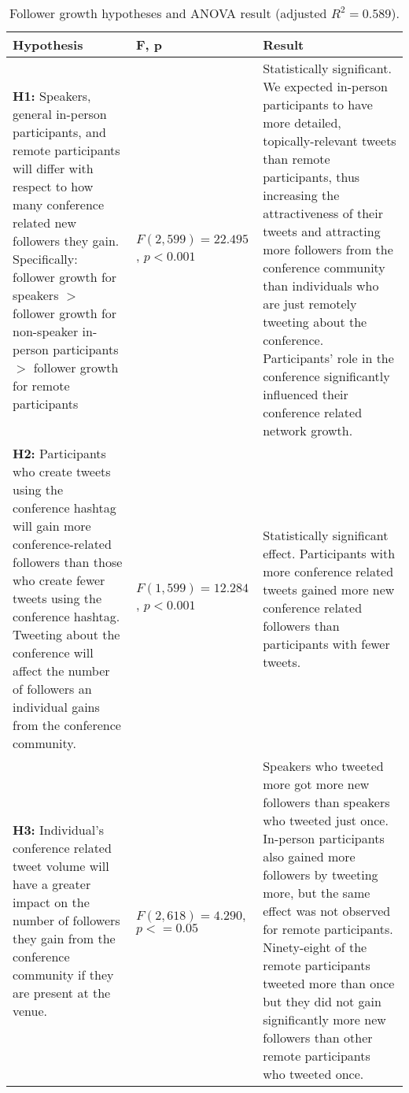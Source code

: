 \documentclass[conference,final]{IEEEtran}
\begin{document}
\begin{table*}[htbp]
	\centering
	  \addtolength{\belowcaptionskip}{-50pt}	
	\setlength\abovecaptionskip{0pt}%
  \setlength\belowcaptionskip{10pt}%
	\caption{Follower growth hypotheses and ANOVA result (adjusted $R^2 = 0.589$).}
	\label{tab:hypothesis}
		\begin{tabular}{|>{\raggedright\arraybackslash}p{}|>{\raggedright\arraybackslash}p{}|>{\raggedright\arraybackslash}p{}|}
			\hline\hline %

Hypothesis  & F, p & Result \\ %
\hline %
\textbf{H1:} Speakers, general in-person participants, and remote participants will differ with respect to how many conference related new followers they gain. Specifically: follower growth for speakers $>$ follower growth for non-speaker in-person participants $>$ follower growth for remote participants & $F(2,599) = 22.495$, $p < 0.001$ & Statistically significant.  We expected in-person participants to have more detailed, topically-relevant tweets than remote participants, thus increasing the attractiveness of their tweets and attracting more followers from the conference community than individuals who are just remotely tweeting about the conference. Participants' role in the conference significantly influenced their conference related network growth.\\ 
\hline
\textbf{H2:} Participants who create tweets using the conference hashtag will gain more conference-related followers than those who create fewer tweets using the conference hashtag. Tweeting about the conference will affect the number of followers an individual gains from the conference community.  & $F(1,599) = 12.284$, $p < 0.001$ & Statistically significant effect. Participants with more conference related tweets gained more new conference related followers than participants with fewer tweets.\\
\hline
\textbf{H3:} Individual's conference related tweet volume will have a greater impact on the number of followers they gain from the conference community if they are present at the venue. &  $F(2,618) = 4.290$, $p <= 0.05$ & Speakers who tweeted more got more new followers than speakers who tweeted just once. In-person participants also gained more followers by tweeting more, but the same effect was not observed for remote participants. Ninety-eight of the remote participants tweeted more than once but they did not gain significantly more new followers than other remote participants who tweeted once.\\
\hline\hline %
		\end{tabular}
	\end{table*}
\end{document}
